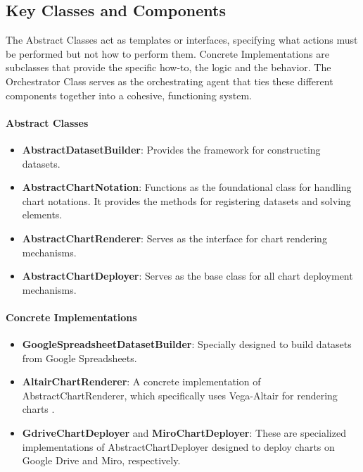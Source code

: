 \subsection{Key Classes and
Components}\label{key-classes-and-components}

The Abstract Classes act as templates or interfaces, specifying what
actions must be performed but not how to perform them. Concrete
Implementations are subclasses that provide the specific
\textquotesingle how-to\textquotesingle, the logic and the behavior. The
Orchestrator Class serves as the orchestrating agent that ties these
different components together into a cohesive, functioning system.

\paragraph{Abstract Classes}\label{abstract-classes}

\begin{itemize}
\item
  \textbf{AbstractDatasetBuilder}: Provides the framework for
  constructing datasets.
\item
  \textbf{AbstractChartNotation}: Functions as the foundational class
  for handling chart notations. It provides the methods for registering
  datasets and solving elements.
\item
  \textbf{AbstractChartRenderer}: Serves as the interface for chart
  rendering mechanisms.
\item
  \textbf{AbstractChartDeployer}: Serves as the base class for all chart
  deployment mechanisms.
\end{itemize}

\paragraph{Concrete Implementations}\label{concrete-implementations}

\begin{itemize}
\item
  \textbf{GoogleSpreadsheetDatasetBuilder}: Specially designed to build
  datasets from Google Spreadsheets.
\item
  \textbf{AltairChartRenderer}: A concrete implementation of
  AbstractChartRenderer, which specifically uses Vega-Altair for
  rendering charts \cite{49}.
\item
  \textbf{GdriveChartDeployer} and \textbf{MiroChartDeployer}: These are
  specialized implementations of AbstractChartDeployer designed to
  deploy charts on Google Drive and Miro, respectively.
\end{itemize}

